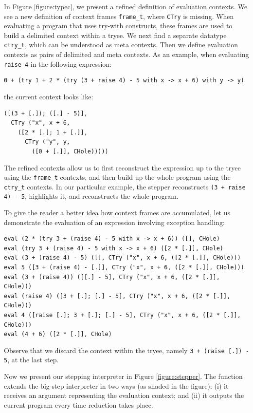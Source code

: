 In Figure \ref{figure:typec}, we present a refined definition of evaluation contexts.  We see a new definition of context frames \texttt{frame\_t}, where \texttt{CTry} is missing.  When evaluating a program that uses try-with constructs, these frames are used to build a delimited context within a tryee.  We next find a separate datatype \texttt{ctry\_t}, which can be understood as meta contexts.  Then we define evaluation contexts as pairs of delimited and meta contexts.  As an example, when evaluating \texttt{raise 4} in the following expression:
\begin{verbatim}
0 + (try 1 + 2 * (try (3 + raise 4) - 5 with x -> x + 6) with y -> y)
\end{verbatim}
\noindent the current context looks like:
\begin{verbatim}
([(3 + [.]); ([.] - 5)],
  CTry ("x", x + 6,
    ([2 * [.]; 1 + [.]],
      CTry ("y", y,
        ([0 + [.]], CHole)))))
\end{verbatim}

The refined contexts allow us to first reconstruct the expression up to the tryee using the \texttt{frame\_t} contexts, and then build up the whole program using the \texttt{ctry\_t} contexts.  In our particular example, the stepper reconstructs \texttt{(3 + raise 4) - 5}, highlights it, and reconstructs the whole program.

To give the reader a better idea how context frames are accumulated, let us demonstrate the evaluation of an expression involving exception handling:

\begin{verbatim}
eval (2 * (try 3 + (raise 4) - 5 with x -> x + 6)) ([], CHole)
eval (try 3 + (raise 4) - 5 with x -> x + 6) ([2 * [.]], CHole)
eval (3 + (raise 4) - 5) ([], CTry ("x", x + 6, ([2 * [.]], CHole)))
eval 5 ([3 + (raise 4) - [.]], CTry ("x", x + 6, ([2 * [.]], CHole)))
eval (3 + (raise 4)) ([[.] - 5], CTry ("x", x + 6, ([2 * [.]], CHole)))
eval (raise 4) ([3 + [.]; [.] - 5], CTry ("x", x + 6, ([2 * [.]], CHole)))
eval 4 ([raise [.]; 3 + [.]; [.] - 5], CTry ("x", x + 6, ([2 * [.]], CHole)))
eval (4 + 6) ([2 * [.]], CHole)
\end{verbatim}

\noindent Observe that we discard the context within the tryee, namely \texttt{3 + (raise [.])\ - 5}, at the last step.

Now we present our stepping interpreter in Figure \ref{figure:stepper}.  The function extends the big-step interpreter in two ways (as shaded in the figure): (i) it receives an argument representing the evaluation context; and (ii) it outputs the current program every time reduction takes place.  

